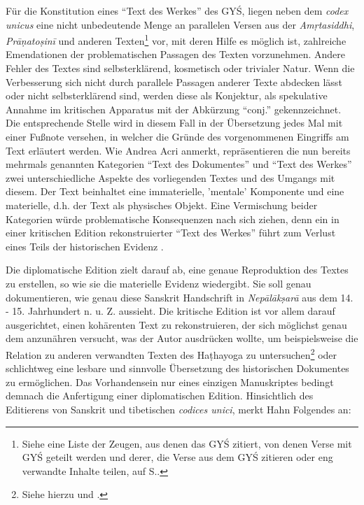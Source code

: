 \documentclass[a4paper,12pt]{article}
\begin{document}
{Für die Konstitution eines ``Text des Werkes'' des GYŚ, liegen neben dem \textit{codex unicus} eine nicht unbedeutende Menge an parallelen Versen aus der \textit{Amṛtasiddhi}, \textit{Prāṇatoṣinī} und anderen Texten\footnote{Siehe eine Liste der Zeugen, aus denen das GYŚ zitiert, von denen Verse mit GYŚ geteilt werden und derer, die Verse aus dem GYŚ zitieren oder eng verwandte Inhalte teilen, auf S.\pageref{zeugsigla}.} vor, mit deren Hilfe es möglich ist, zahlreiche Emendationen der problematischen Passagen des Texten vorzunehmen. Andere Fehler des Textes sind selbsterklärend, kosmetisch oder trivialer Natur. Wenn die Verbesserung sich nicht durch parallele Passagen anderer Texte abdecken lässt oder nicht selbsterklärend sind, werden diese als Konjektur, als spekulative Annahme im kritischen Apparatus mit der Abkürzung ``conj.'' gekennzeichnet. Die entsprechende Stelle wird in diesem Fall in der Übersetzung jedes Mal mit einer Fußnote versehen, in welcher die Gründe des vorgenommenen Eingriffs am Text erläutert werden. Wie Andrea Acri \parencite[81]{acri2011dharma} anmerkt, repräsentieren die nun bereits mehrmals genannten Kategorien ``Text des Dokumentes'' und ``Text des Werkes'' zwei unterschiedliche Aspekte des vorliegenden Textes und des Umgangs mit diesem. Der Text beinhaltet eine immaterielle, 'mentale' Komponente und eine materielle, d.h. der Text als physisches Objekt. Eine Vermischung beider Kategorien würde problematische Konsequenzen nach sich ziehen, denn ein in einer kritischen Edition rekonstruierter ``Text des Werkes'' führt zum Verlust eines Teils der historischen Evidenz \parencite[29]{tanselle1989}. 

Die diplomatische Edition zielt darauf ab, eine genaue Reproduktion des Textes zu erstellen, so wie sie die materielle Evidenz wiedergibt. Sie soll genau dokumentieren, wie genau diese Sanskrit Handschrift in \textit{Nepālākṣarā} aus dem 14. - 15. Jahrhundert n. u. Z. aussieht. Die kritische Edition ist vor allem darauf ausgerichtet, einen kohärenten Text zu rekonstruieren, der sich möglichst genau dem anzunähren versucht, was der Autor ausdrücken wollte, um beispielsweise die Relation zu anderen verwandten Texten des Haṭhayoga zu untersuchen\footnote{Siehe hierzu \parencite[76-77]{dehaan1973} und \parencite[17-21]{robson1988}.} oder schlichtweg eine lesbare und sinnvolle Übersetzung des historischen Dokumentes zu ermöglichen. Das Vorhandensein nur eines einzigen Manuskriptes bedingt demnach die Anfertigung einer diplomatischen Edition. Hinsichtlich des Editierens von Sanskrit und tibetischen \textit{codices unici}, merkt Hahn Folgendes an:

}
\end{document}
